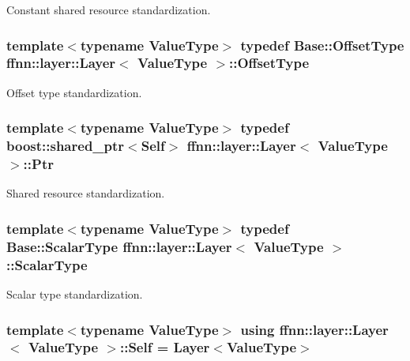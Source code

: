Constant shared resource standardization. 

\hypertarget{classffnn_1_1layer_1_1_layer_a0e35ffd6e0657856f3a75323b2db9fcb}{
\subsubsection[{Offset\-Type}]{\setlength{\rightskip}{0pt plus 5cm}template$<$typename Value\-Type$>$ typedef {\bf Base\-::\-Offset\-Type} {\bf ffnn\-::layer\-::\-Layer}$<$ Value\-Type $>$\-::{\bf Offset\-Type}}}\label{classffnn_1_1layer_1_1_layer_a0e35ffd6e0657856f3a75323b2db9fcb}


Offset type standardization. 

\hypertarget{classffnn_1_1layer_1_1_layer_ac336e7cc01ccf0117c5a4a2baf98add4}{
\subsubsection[{Ptr}]{\setlength{\rightskip}{0pt plus 5cm}template$<$typename Value\-Type$>$ typedef boost\-::shared\-\_\-ptr$<${\bf Self}$>$ {\bf ffnn\-::layer\-::\-Layer}$<$ Value\-Type $>$\-::{\bf Ptr}}}\label{classffnn_1_1layer_1_1_layer_ac336e7cc01ccf0117c5a4a2baf98add4}


Shared resource standardization. 

\hypertarget{classffnn_1_1layer_1_1_layer_ab63020e6e3d9270a748cb22c2432c93a}{
\subsubsection[{Scalar\-Type}]{\setlength{\rightskip}{0pt plus 5cm}template$<$typename Value\-Type$>$ typedef {\bf Base\-::\-Scalar\-Type} {\bf ffnn\-::layer\-::\-Layer}$<$ Value\-Type $>$\-::{\bf Scalar\-Type}}}\label{classffnn_1_1layer_1_1_layer_ab63020e6e3d9270a748cb22c2432c93a}


Scalar type standardization. 

\hypertarget{classffnn_1_1layer_1_1_layer_a1d461b24632a849b2c26a5051a9cdbeb}{
\subsubsection[{Self}]{\setlength{\rightskip}{0pt plus 5cm}template$<$typename Value\-Type$>$ using {\bf ffnn\-::layer\-::\-Layer}$<$ Value\-Type $>$\-::{\bf Self} =  {\bf Layer}$<$Value\-Type$>$}}\label{classffnn_1_1layer_1_1_layer_a1d461b24632a849b2c26a5051a9cdbeb}


